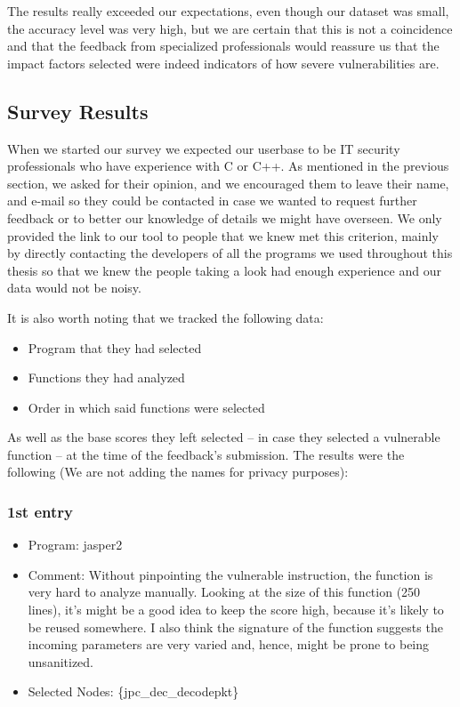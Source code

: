 The results really exceeded our expectations, even though our dataset was small, the accuracy level was very high, but we are certain that this is not a coincidence and that the feedback from specialized professionals would reassure us that the impact factors selected were indeed indicators of how severe vulnerabilities are.

\subsection{Survey Results}

When we started our survey we expected our userbase to be IT security professionals who have experience with C or C++. As mentioned in the previous section, we asked for their opinion, and we encouraged them to leave their name, and e-mail so they could be contacted in case we wanted to request further feedback or to better our knowledge of details we might have overseen. We only provided the link to our tool to people that we knew met this criterion, mainly by directly contacting the developers of all the programs we used throughout this thesis so that we knew the people taking a look had enough experience and our data would not be noisy.

It is also worth noting that we tracked the following data:

\begin{itemize}
	\item Program that they had selected
	\item Functions they had analyzed
	\item Order in which said functions were selected
\end{itemize}

As well as the base scores they left selected -- in case they selected a vulnerable function -- at the time of the feedback's submission. The results were the following (We are not adding the names for privacy purposes):

\subsubsection{1st entry}

\begin{itemize}
	\item Program: jasper2
	\item Comment: Without pinpointing the vulnerable instruction, the function is very hard to analyze manually. 
	Looking at the size of this function (250 lines), it's might be a good idea to keep the score high, because it's likely to be reused somewhere. 
	I also think the signature of the function suggests the incoming parameters are very varied and, hence, might be prone to being unsanitized.  
	\item Selected Nodes: \{jpc\_dec\_decodepkt\}
\end{itemize}

